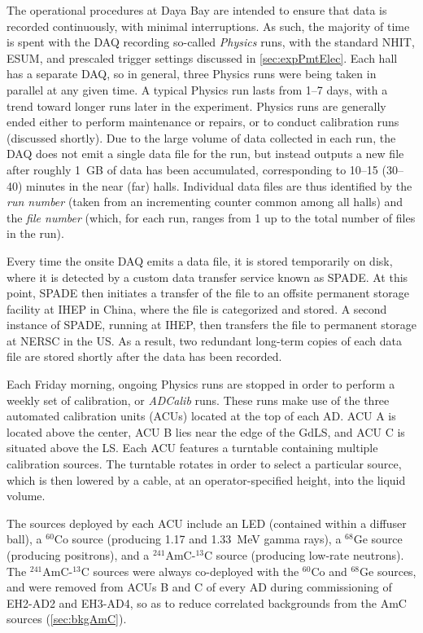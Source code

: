 \documentclass[../thesis.tex]{subfiles}
\begin{document}
The operational procedures at Daya Bay are intended to ensure that data is recorded continuously, with minimal interruptions. As such, the majority of time is spent with the DAQ recording so-called \emph{Physics} runs, with the standard NHIT, ESUM, and prescaled trigger settings discussed in \autoref{sec:expPmtElec}. Each hall has a separate DAQ, so in general, three Physics runs were being taken in parallel at any given time. A typical Physics run lasts from 1--7 days, with a trend toward longer runs later in the experiment. Physics runs are generally ended either to perform maintenance or repairs, or to conduct calibration runs (discussed shortly). Due to the large volume of data collected in each run, the DAQ does not emit a single data file for the run, but instead outputs a new file after roughly 1~GB of data has been accumulated, corresponding to 10--15 (30--40) minutes in the near (far) halls. Individual data files are thus identified by the \emph{run number} (taken from an incrementing counter common among all halls) and the \emph{file number} (which, for each run, ranges from 1 up to the total number of files in the run).

Every time the onsite DAQ emits a data file, it is stored temporarily on disk, where it is detected by a custom data transfer service known as SPADE. At this point, SPADE then initiates a transfer of the file to an offsite permanent storage facility at IHEP in China, where the file is categorized and stored. A second instance of SPADE, running at IHEP, then transfers the file to permanent storage at NERSC in the US. As a result, two redundant long-term copies of each data file are stored shortly after the data has been recorded.

Each Friday morning, ongoing Physics runs are stopped in order to perform a weekly set of calibration, or \emph{ADCalib} runs. These runs make use of the three automated calibration units (ACUs) located at the top of each AD. ACU A is located above the center, ACU B lies near the edge of the GdLS, and ACU C is situated above the LS. Each ACU features a turntable containing multiple calibration sources. The turntable rotates in order to select a particular source, which is then lowered by a cable, at an operator-specified height, into the liquid volume.

The sources deployed by each ACU include an LED (contained within a diffuser ball), a $^{60}$Co source (producing 1.17 and 1.33~MeV gamma rays), a $^{68}$Ge source (producing positrons), and a $^{241}$AmC-$^{13}$C source (producing low-rate neutrons). The $^{241}$AmC-$^{13}$C sources were always co-deployed with the $^{60}$Co and $^{68}$Ge sources, and were removed from ACUs B and C of every AD during commissioning of EH2-AD2 and EH3-AD4, so as to reduce correlated backgrounds from the AmC sources (\autoref{sec:bkgAmC}).
\end{document}
